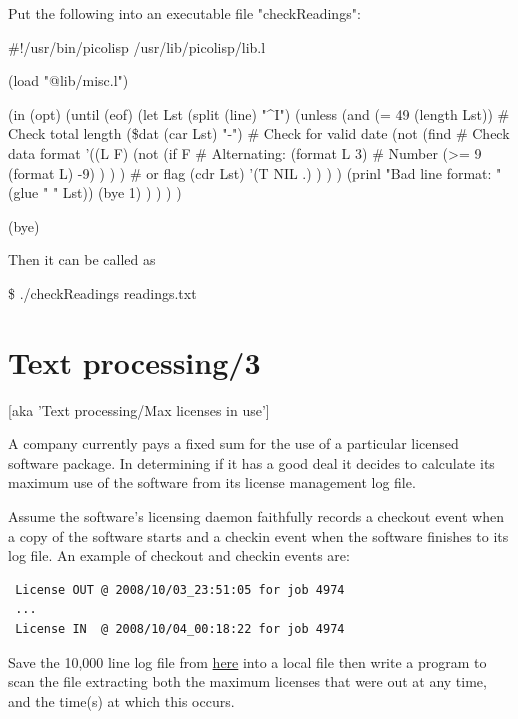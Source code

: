 \begin{wideverbatim}

Put the following into an executable file "checkReadings":

#!/usr/bin/picolisp /usr/lib/picolisp/lib.l

(load "@lib/misc.l")

(in (opt)
   (until (eof)
      (let Lst (split (line) "^I")
         (unless
            (and
               (= 49 (length Lst))     # Check total length
               (\$dat (car Lst) "-")    # Check for valid date
               (not
                  (find                # Check data format
                     '((L F)
                        (not
                           (if F                            # Alternating:
                              (format L 3)                  # Number
                              (>= 9 (format L) -9) ) ) )    # or flag
                     (cdr Lst)
                     '(T NIL .) ) ) )
            (prinl "Bad line format: " (glue " " Lst))
            (bye 1) ) ) ) )

(bye)

Then it can be called as

\$ ./checkReadings readings.txt

\end{wideverbatim}

\pagebreak{}
\section*{Text processing/3}
[aka 'Text processing/Max licenses in use']

A company currently pays a fixed sum for the use of a particular
licensed software package. In determining if it has a good deal it
decides to calculate its maximum use of the software from its license
management log file.

Assume the software's licensing daemon faithfully records a checkout
event when a copy of the software starts and a checkin event when the
software finishes to its log file. An example of checkout and checkin
events are:

\begin{verbatim}
 License OUT @ 2008/10/03_23:51:05 for job 4974
 ...
 License IN  @ 2008/10/04_00:18:22 for job 4974
\end{verbatim}

Save the 10,000 line log file from
\href{http://rosettacode.org/resources/mlijobs.txt}{here} into a local
file then write a program to scan the file extracting both the maximum
licenses that were out at any time, and the time(s) at which this
occurs.


